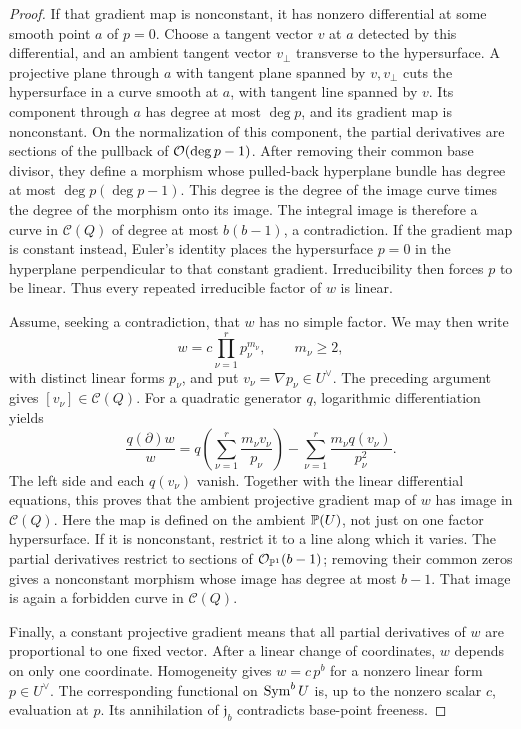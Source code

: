 \begin{proof}
If that gradient map is nonconstant, it has nonzero differential
at some smooth point \(a\) of \(p=0\). Choose a tangent vector \(v\)
at \(a\) detected by this differential, and an ambient tangent vector
\(v_{\perp}\) transverse to the hypersurface. A projective plane through \(a\)
with tangent plane spanned by \(v,v_{\perp}\) cuts the hypersurface in a curve
smooth at \(a\), with tangent line spanned by \(v\). Its component
through \(a\) has degree at most \(\deg p\), and its gradient map is
nonconstant. On the normalization of this component, the partial
derivatives are sections of the pullback of \(\mathcal O(\deg p-1)\).
After removing their common base divisor, they define a morphism
whose pulled-back hyperplane bundle has degree at most
\(\deg p(\deg p-1)\). This degree is the degree of the image curve
times the degree of the morphism onto its image. The integral image
is therefore a curve in \(\mathcal C(Q)\) of degree at most
\(b(b-1)\), a contradiction.
If the gradient map is constant instead, Euler's identity
places the hypersurface \(p=0\) in the hyperplane perpendicular
to that constant gradient. Irreducibility then forces \(p\) to
be linear. Thus every repeated irreducible factor of \(w\) is linear.

Assume, seeking a contradiction, that \(w\) has no simple factor.
We may then write
\[
 w=c\prod_{\nu=1}^r p_\nu^{m_\nu},
 \qquad m_\nu\ge2,
\]
with distinct linear forms \(p_\nu\), and put
\(v_\nu=\nabla p_\nu\in U^\vee\).
The preceding argument gives \([v_\nu]\in\mathcal C(Q)\).
For a quadratic generator \(q\), logarithmic differentiation yields
\[
 \frac{q(\partial)w}{w}
 =
 q\left(\sum_{\nu=1}^r\frac{m_\nu v_\nu}{p_\nu}\right)
 -\sum_{\nu=1}^r\frac{m_\nu q(v_\nu)}{p_\nu^2}.
\]
The left side and each \(q(v_\nu)\) vanish. Together with the
linear differential equations, this proves that the ambient
projective gradient map of \(w\) has image in \(\mathcal C(Q)\).
Here the map is defined on the ambient \(\mathbb P(U)\), not just on
one factor hypersurface. If it is nonconstant, restrict it to a line
along which it varies. The partial derivatives restrict to sections
of \(\mathcal O_{\mathbb P^1}(b-1)\); removing their common zeros gives a
nonconstant morphism whose image has degree at most \(b-1\).
That image is again a forbidden curve in \(\mathcal C(Q)\).

Finally, a constant projective gradient means that all partial
derivatives of \(w\) are proportional to one fixed vector.
After a linear change of coordinates, \(w\) depends on only one
coordinate. Homogeneity gives \(w=c\,p^b\) for a nonzero linear
form \(p\in U^\vee\). The corresponding functional on \(\operatorname{Sym}^b U\)
is, up to the nonzero scalar \(c\), evaluation at \(p\).
Its annihilation of \(\mathfrak j_b\) contradicts base-point freeness.
\end{proof}

